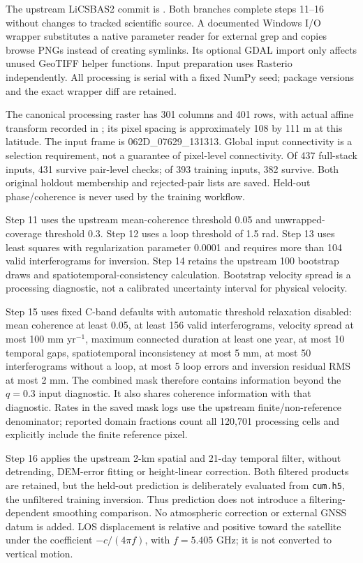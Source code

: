 The upstream LiCSBAS2 commit is . Both branches complete steps 11--16 without changes to tracked scientific source. A documented Windows I/O wrapper substitutes a native parameter reader for external grep and copies browse PNGs instead of creating symlinks. Its optional GDAL import only affects unused GeoTIFF helper functions. Input preparation uses Rasterio independently. All processing is serial with a fixed NumPy seed; package versions and the exact wrapper diff are retained.

The canonical processing raster has 301 columns and 401 rows, with actual affine transform recorded in ; its pixel spacing is approximately 108 by 111 m at this latitude. The input frame is 062D\_07629\_131313. Global input connectivity is a selection requirement, not a guarantee of pixel-level connectivity. Of 437 full-stack inputs, 431 survive pair-level checks; of 393 training inputs, 382 survive. Both original holdout membership and rejected-pair lists are saved. Held-out phase/coherence is never used by the training workflow.

Step 11 uses the upstream mean-coherence threshold 0.05 and unwrapped-coverage threshold 0.3. Step 12 uses a loop threshold of 1.5 rad. Step 13 uses least squares with regularization parameter 0.0001 and requires more than 104 valid interferograms for inversion. Step 14 retains the upstream 100 bootstrap draws and spatiotemporal-consistency calculation. Bootstrap velocity spread is a processing diagnostic, not a calibrated uncertainty interval for physical velocity.

Step 15 uses fixed C-band defaults with automatic threshold relaxation disabled: mean coherence at least 0.05, at least 156 valid interferograms, velocity spread at most 100 mm yr$^{-1}$, maximum connected duration at least one year, at most 10 temporal gaps, spatiotemporal inconsistency at most 5 mm, at most 50 interferograms without a loop, at most 5 loop errors and inversion residual RMS at most 2 mm. The combined mask therefore contains information beyond the $q=0.3$ input diagnostic. It also shares coherence information with that diagnostic. Rates in the saved mask logs use the upstream finite/non-reference denominator; reported domain fractions count all 120,701 processing cells and explicitly include the finite reference pixel.

Step 16 applies the upstream 2-km spatial and 21-day temporal filter, without detrending, DEM-error fitting or height-linear correction. Both filtered products are retained, but the held-out prediction is deliberately evaluated from \texttt{cum.h5}, the unfiltered training inversion. Thus prediction does not introduce a filtering-dependent smoothing comparison. No atmospheric correction or external GNSS datum is added. LOS displacement is relative and positive toward the satellite under the coefficient $-c/(4\pi f)$, with $f=5.405$ GHz; it is not converted to vertical motion.

